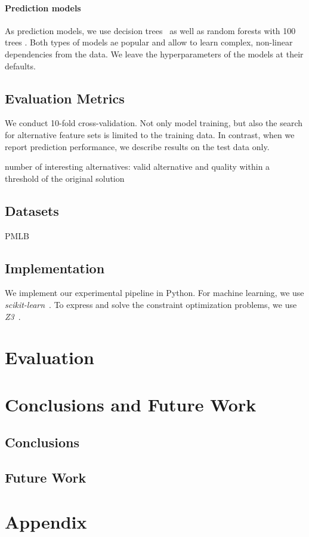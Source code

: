 \documentclass{article}
\theoremstyle{definition}
\begin{document}
\paragraph{Prediction models}

As prediction models, we use decision trees~\cite{breiman1984classification} as well as random forests with 100 trees \cite{breiman2001random}.
Both types of models ae popular and allow to learn complex, non-linear dependencies from the data.
We leave the hyperparameters of the models at their defaults.

\subsection{Evaluation Metrics}

We conduct 10-fold cross-validation.
Not only model training, but also the search for alternative feature sets is limited to the training data.
In contrast, when we report prediction performance, we describe results on the test data only.

number of interesting alternatives: valid alternative and quality within a threshold of the original solution

\subsection{Datasets}

PMLB \cite{olson2017pmlb, romano2021pmlb}

\subsection{Implementation}

We implement our experimental pipeline in Python.
For machine learning, we use \emph{scikit-learn}~\cite{pedregosa2011scikit-learn}.
To express and solve the constraint optimization problems, we use \emph{Z3}~\cite{deMoura2008z3}.

\section{Evaluation}
\label{sec:evaluation}

\section{Conclusions and Future Work}
\label{sec:conclusion}

\subsection{Conclusions}

\subsection{Future Work}

\printbibliography

\appendix

\section{Appendix}
\label{sec:appendix}
\end{document}
